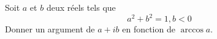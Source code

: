 Soit $a$ et $b$ deux r\'eels tels que
\[a^2+b^2=1, b<0\]
Donner un argument de $a+ib$ en fonction de $\arccos a$. \bigskip